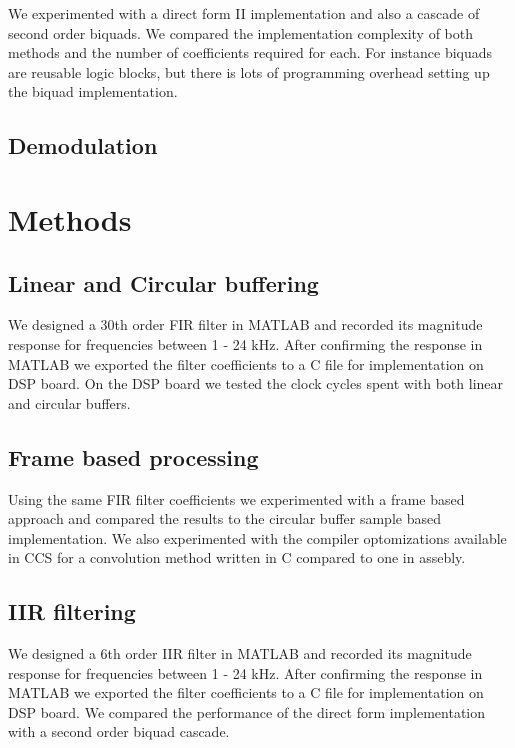 \documentclass{article}
\begin{document}
We experimented with a direct form II implementation and also a cascade of second order biquads.
We compared the implementation complexity of both methods and the number of coefficients required for each.
For instance biquads are reusable logic blocks, but there is lots of programming overhead setting up the biquad implementation.

\subsection{Demodulation}



\section{Methods}

\subsection{Linear and Circular buffering}

We designed a 30th order FIR filter in MATLAB and recorded its magnitude response for frequencies between 1 - 24 kHz.
After confirming the response in MATLAB we exported the filter coefficients to a C file for implementation on DSP board.
On the DSP board we tested the clock cycles spent with both linear and circular buffers.

\subsection{Frame based processing}

Using the same FIR filter coefficients we experimented with a frame based approach and compared the results to the circular buffer sample based implementation.
We also experimented with the compiler optomizations available in CCS for a convolution method written in C compared to one in assebly.

\subsection{IIR filtering}

We designed a 6th order IIR filter in MATLAB and recorded its magnitude response for frequencies between 1 - 24 kHz.
After confirming the response in MATLAB we exported the filter coefficients to a C file for implementation on DSP board.
We compared the performance of the direct form implementation with a second order biquad cascade.
 
\end{document}
